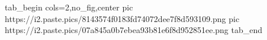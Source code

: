  
 
 
 
 
\zzSecCmtScr

\ifcmt
  tab_begin cols=2,no_fig,center
     pic https://i2.paste.pics/8143574f0183fd74072dee7f8d593109.png
     pic https://i2.paste.pics/07a845a0b7ebea93b81e6f8d952851ee.png
  tab_end
\fi
